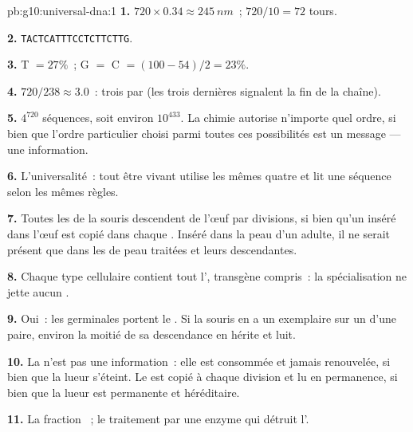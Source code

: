 \begin{solution}{pb:g10:universal-dna:1}
\textbf{1.} $720 \times 0.34 \approx \qty{245}{nm}$~; $720/10 = 72$
tours.

\textbf{2.} \texttt{TACTCATTTCCTCTTCTTG}.

\textbf{3.} T $= 27\%$~; G $=$ C $= (100 - 54)/2 = 23\%$.

\textbf{4.} $720/238 \approx 3.0$~: trois  par  (les
trois dernières signalent la fin de la chaîne).

\textbf{5.} $4^{720}$ séquences, soit environ $10^{433}$. La chimie
autorise n'importe quel ordre, si bien que l'ordre particulier choisi
parmi toutes ces possibilités est un message --- une information.

\textbf{6.} L'universalité~: tout être vivant utilise les mêmes quatre
 et lit une séquence selon les mêmes règles.

\textbf{7.} Toutes les  de la souris descendent de l'œuf par
divisions, si bien qu'un  inséré dans l'œuf est copié dans chaque
. Inséré dans la peau d'un adulte, il ne serait présent que dans
les  de peau traitées et leurs descendantes.

\textbf{8.} Chaque type cellulaire contient tout l', transgène
compris~: la spécialisation ne jette aucun .

\textbf{9.} Oui~: les  germinales portent le . Si la souris
en a un exemplaire sur un  d'une paire, environ la moitié de
sa descendance en hérite et luit.

\textbf{10.} La  n'est pas une information~: elle est consommée
et jamais renouvelée, si bien que la lueur s'éteint. Le  est copié
à chaque division et lu en permanence, si bien que la lueur est
permanente et héréditaire.

\textbf{11.} La fraction ~; le traitement par une enzyme qui détruit
l'.


\end{solution}
